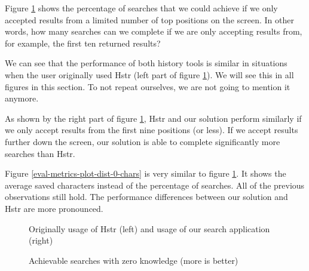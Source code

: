Figure \ref{eval-metrics-plot-dist-0-cmds} shows the percentage of searches that we could achieve if we only accepted results from a limited number of top positions on the screen. In other words, how many searches can we complete if we are only accepting results from, for example, the first ten returned results?

We can see that the performance of both history tools is similar in situations when the user originally used Hstr (left part of figure \ref{eval-metrics-plot-dist-0-cmds}). We will see this in all figures in this section. To not repeat ourselves, we are not going to mention it anymore.

As shown by the right part of figure \ref{eval-metrics-plot-dist-0-cmds}, Hstr and our solution perform similarly if we only accept results from the first nine positions (or less). If we accept results further down the screen, our solution is able to complete significantly more searches than Hstr.

Figure \ref{eval-metrics-plot-dist-0-chars} is very similar to figure \ref{eval-metrics-plot-dist-0-cmds}. It shows the average saved characters instead of the percentage of searches. All of the previous observations still hold. The performance differences between our solution and Hstr are more pronounced. 


\begin{figure}
\centering
{}\hfill
{}
\caption{Achievable searches with zero knowledge (more is better)}
\small{Originally usage of Hstr (left) and usage of our search application (right)}
\label{eval-metrics-plot-dist-0-cmds}
\end{figure}

